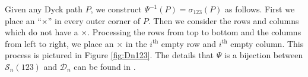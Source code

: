 \documentclass[
final,nomarks
]{dmtcs-episciences}
\newcommand{\fref}[1]{Figure \ref{fig:#1}}
\newcommand{\Sn}[1]{\mathcal{S}_{#1}}
\begin{document}
Given any Dyck path \begin{math}P\end{math}, we construct \begin{math}\Psi^{-1}(P) = \sigma_{123}(P)\end{math} as follows. 
First we place an ``{\color{green!50!black}\begin{math}\times\end{math}}'' in every outer corner of \begin{math}P\end{math}. Then we consider 
the rows and columns which do not have a {\color{green!50!black}\begin{math}\times\end{math}}. Processing the rows from top to bottom 
and the columns from left to right, we place an \begin{math}\times\end{math} in the 
\begin{math}i^{\mathrm{th}}\end{math} empty row and \begin{math}i^{\mathrm{th}}\end{math} empty column. This process is 
pictured in \fref{Dn123}. The details that \begin{math}\Psi\end{math} is a bijection 
between \begin{math}\Sn{n}(123)\end{math} and \begin{math}\mathcal{D}_n\end{math} can be found in \cite{EliDeu}.
\end{document}
